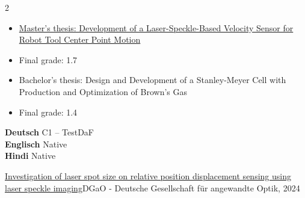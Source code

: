 \documentclass[9pt,a4paper,withhyper]{altacv}
\begin{document}
\begin{paracol}{2}
%
%
%
\switchcolumn

  \begin{itemize}
    \item \href{https://drive.google.com/file/d/1J5xoOq-rh2UYf5aAfnolYBZ7_LzZLqmU/view}{Master’s thesis: Development of a Laser-Speckle-Based Velocity Sensor for Robot Tool Center Point Motion}
    \item Final grade: 1.7
  \end{itemize}

  \divider

  \begin{itemize}
      \item Bachelor’s thesis: Design and Development of a Stanley-Meyer Cell with Production and Optimization of Brown’s Gas 
      \item Final grade: 1.4
  \end{itemize}

  \textbf{Deutsch} \hspace{1.02cm} C1 -- TestDaF \\
  \textbf{Englisch} \hspace{1.05cm} Native \\
  \textbf{Hindi} \hspace{1.45cm} Native

  \cvachievement{\faCertificate} 
  {\href{https://www.dgao-proceedings.de/download/125/125_p10.pdf}{Investigation of laser spot size on relative position displacement sensing using laser speckle imaging}}{DGaO - Deutsche Gesellschaft für angewandte Optik, 2024}


\end{paracol}
\end{document}
